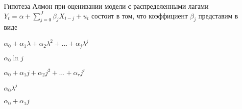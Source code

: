 
\begin{question}
Гипотеза Алмон при оценивании модели с распределенными лагами \(Y_t = \alpha + \sum_{j=0}^J\beta_j X_{t-j} + u_t\)
состоит в том, что коэффициент \(\beta_j\) представим в виде
\begin{answerlist}
  \item \(\alpha_0 + \alpha_1 \lambda + \alpha_2 \lambda^2 +\ldots + \alpha_j \lambda^j\)
  \item \(\alpha_0 \ln j\)
  \item \(\alpha_0 + \alpha_1 j + \alpha_2 j^2 + \ldots + \alpha_r j^r\)
  \item \(\alpha_0 \lambda^j\)
  \item \(\alpha_0 + \alpha_1 j\)
\end{answerlist}
\end{question}


